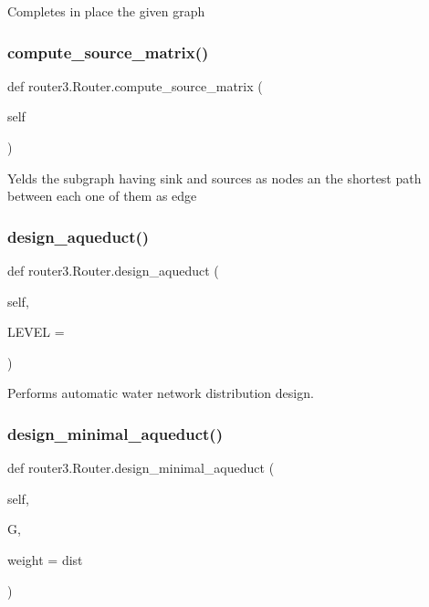\begin{DoxyVerb}Completes in place the given graph
\end{DoxyVerb}
 \mbox{\label{classrouter3_1_1_router_ae092bc8d0866872bc5af263bd4700c5e}} 
\subsubsection{compute\+\_\+source\+\_\+matrix()}
{\footnotesize\ttfamily def router3.\+Router.\+compute\+\_\+source\+\_\+matrix (\begin{DoxyParamCaption}\item[{}]{self }\end{DoxyParamCaption})}

\begin{DoxyVerb}Yelds the subgraph having sink and sources as nodes
an the shortest path between each one of them as edge
\end{DoxyVerb}
 \mbox{\label{classrouter3_1_1_router_a56fa1121d7c716890c9352945ba9a760}} 
\subsubsection{design\+\_\+aqueduct()}
{\footnotesize\ttfamily def router3.\+Router.\+design\+\_\+aqueduct (\begin{DoxyParamCaption}\item[{}]{self,  }\item[{}]{L\+E\+V\+EL = {} }\end{DoxyParamCaption})}

\begin{DoxyVerb}Performs automatic water network distribution design.
\end{DoxyVerb}
 \mbox{\label{classrouter3_1_1_router_a79af880915c6cb8e7527129a1bd5140d}} 
\subsubsection{design\+\_\+minimal\+\_\+aqueduct()}
{\footnotesize\ttfamily def router3.\+Router.\+design\+\_\+minimal\+\_\+aqueduct (\begin{DoxyParamCaption}\item[{}]{self,  }\item[{}]{G,  }\item[{}]{weight = {\ttfamily \textquotesingle{}dist\textquotesingle{}} }\end{DoxyParamCaption})}

